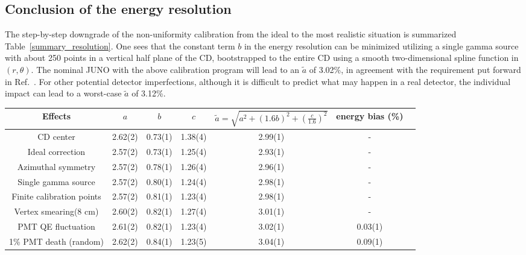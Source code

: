 \documentclass[a4paper,10pt,twoside]{cpc-hepnp}
\begin{document}
\begin{CJK*}{GB}{gbsn}
\begin{multicols}{2}
\subsection{Conclusion of the energy resolution}
The step-by-step downgrade of the non-uniformity calibration from the
ideal to the most realistic situation is summarized
Table~\ref{summary_resolution}. One sees that the constant term $b$ in
the energy resolution can be minimized utilizing a single gamma source
with about 250 points in a vertical half plane of the CD, bootstrapped
to the entire CD using a smooth two-dimensional spline function in
$(r,\theta)$. The nominal JUNO with the above
  calibration program will lead to an $\tilde a$ of 3.02\%, in
  agreement with the requirement put forward in
  Ref.~\cite{yellow-book}. For other potential detector imperfections,
  although it is difficult to predict what may happen in a real
  detector, the individual impact can lead to a worst-case $\tilde a$ of
  3.12\%.
\end{multicols}
\begin{center}
    \footnotesize
  \begin{tabular*}{170mm}{@{\extracolsep{\fill}}ccccccc}
    \toprule  %
    Effects & $a$ & $b$ & $c$ & $\tilde{a}=\sqrt{a^{2} +(1.6b)^{2} + (\frac{c}{1.6})^{2}}$ & energy bias (\%)\\ 
    \hline
    CD center & 2.62(2) & 0.73(1) & 1.38(4) & 2.99(1) & - \\
    Ideal correction & 2.57(2) & 0.73(1) & 1.25(4) & 2.93(1) & - \\
    Azimuthal symmetry & 2.57(2) & 0.78(1) & 1.26(4) & 2.96(1) & - \\
    Single gamma source & 2.57(2) & 0.80(1)& 1.24(4) & 2.98(1) & - \\
    Finite calibration points & 2.57(2) & 0.81(1)& 1.23(4) & 2.98(1) & - \\
    Vertex smearing(8 cm) &2.60(2) & 0.82(1) & 1.27(4) & 3.01(1) & - \\
    PMT QE fluctuation & 2.61(2) & 0.82(1) & 1.23(4) & 3.02(1) & 0.03(1)\\\hline
    1\% PMT death (random)&2.62(2) & 0.84(1) & 1.23(5) & 3.04(1) & 0.09(1) \\

\end{tabular*}
\end{center}
\end{CJK*}
\end{document}
